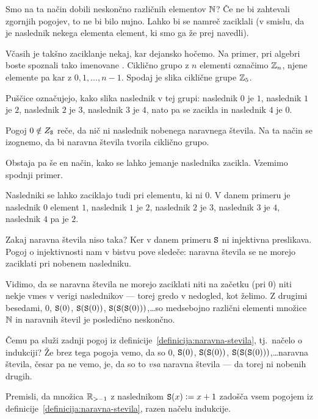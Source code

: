 Smo na ta način dobili neskončno različnih elementov $\mathbb{N}$? Če ne bi zahtevali zgornjih pogojev, to ne bi bilo nujno. Lahko bi se namreč zaciklali (v smislu, da je naslednik nekega elementa element, ki smo ga že prej navedli).

Včasih je takšno zaciklanje nekaj, kar dejansko hočemo. Na primer, pri algebri boste spoznali tako imenovane . Ciklično grupo z $n$ elementi označimo $\mathbb{Z}_n$, njene elemente pa kar z $0, 1, \ldots, n-1$. Spodaj je slika ciklične grupe $\mathbb{Z}_5$.


Puščice označujejo, kako slika naslednik v tej grupi: naslednik $0$ je $1$, naslednik $1$ je $2$, naslednik $2$ je $3$, naslednik $3$ je $4$, nato pa se zacikla in naslednik $4$ je $0$.

Pogoj $0 \notin Z_{\mathtt{S}}$ reče, da nič ni naslednik nobenega naravnega števila. Na ta način se izognemo, da bi naravna števila tvorila ciklično grupo.

Obstaja pa še en način, kako se lahko jemanje naslednika zacikla. Vzemimo spodnji primer.


Nasledniki se lahko zaciklajo tudi pri elementu, ki ni $0$. V danem primeru je naslednik $0$ element $1$, naslednik $1$ je $2$, naslednik $2$ je $3$, naslednik $3$ je $4$, naslednik $4$ pa je $2$.

Zakaj naravna števila niso taka? Ker v danem primeru $\mathtt{S}$ ni injektivna preslikava. Pogoj o injektivnosti nam v bistvu pove sledeče: naravna števila se ne morejo zaciklati pri nobenem nasledniku.

Vidimo, da se naravna števila ne morejo zaciklati niti na začetku (pri $0$) niti nekje vmes v verigi naslednikov --- torej gredo v nedogled, kot želimo. Z drugimi besedami, $0$, $\mathtt{S}(0)$, $\mathtt{S}(\mathtt{S}(0))$, $\mathtt{S}(\mathtt{S}(\mathtt{S}(0)))$,\ldots so medsebojno različni elementi množice $\mathbb{N}$ in naravnih števil je posledično neskončno.

Čemu pa služi zadnji pogoj iz definicije~\ref{definicija:naravna-stevila}, tj.~načelo o indukciji? Že brez tega pogoja vemo, da so $0$, $\mathtt{S}(0)$, $\mathtt{S}(\mathtt{S}(0))$, $\mathtt{S}(\mathtt{S}(\mathtt{S}(0)))$,\ldots naravna števila, česar pa ne vemo, je, da so to \emph{vsa} naravna števila --- da torej ni nobenih drugih.

\begin{vaja}
Premisli, da množica $\mathbb{R}_{> -1}$ z naslednikom $\mathtt{S}(x) \mathrel{\mathop:}= x+1$ zadošča vsem pogojem iz definicije~\ref{definicija:naravna-stevila}, razen načelu indukcije.
\end{vaja}

